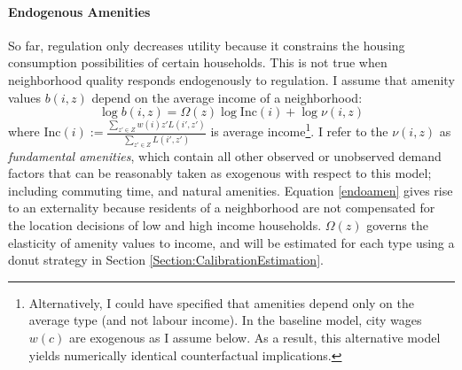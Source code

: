 \documentclass[12pt]{article}
\begin{document}
	\paragraph*{Endogenous Amenities} So far, regulation only decreases utility because it constrains the housing consumption possibilities of certain households. This is not true when neighborhood quality responds endogenously to regulation. I assume that amenity values $b(i, z)$ depend on the average income of a neighborhood:
	\begin{equation}\label{endoamen}
		\log b(i, z) = \Omega(z)\log\text{Inc}(i) + \log \nu(i, z)
	\end{equation}
	 where $\text{Inc}(i) := \frac{\sum_{z' \in Z}w(i)z'L(i', z')}{\sum_{z' \in Z}L(i', z')}$ is average income\footnote{Alternatively, I could have specified that amenities depend only on the average type (and not labour income). In the baseline model, city wages $w(c)$ are exogenous as I assume below. As a result, this alternative model yields numerically identical counterfactual implications.}. I refer to the $\nu(i, z)$ as \textit{fundamental amenities}, which contain all other observed or unobserved demand factors that can be reasonably taken as exogenous with respect to this model; including commuting time, and natural amenities. Equation \eqref{endoamen} gives rise to an externality because residents of a neighborhood are not compensated for the location decisions of low and high income households. $\Omega(z)$ governs the elasticity of amenity values to income, and will be estimated for each type using a donut strategy in Section \ref{Section:CalibrationEstimation}. 
\end{document}
